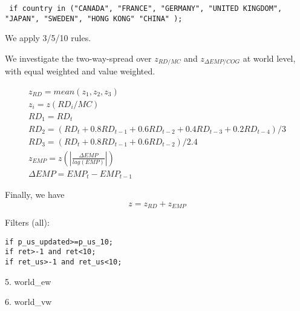

\usepackage[T1]{fontenc}




\thispagestyle{fancy}

\newcommand{\code}{\texttt}
\newcommand*{\Commonpath}{20190128/lagEMP/xUS-one-way-decile-big}



\code{
	if country in ("CANADA",
"FRANCE",
"GERMANY",
"UNITED KINGDOM",
"JAPAN",
"SWEDEN",
"HONG KONG"
"CHINA"
);
}

We apply 3/5/10 rules.

We investigate the two-way-spread over $z_{RD/MC}$ and $z_{\Delta EMP/COG}$ at world level, with equal weighted and value weighted. 


$$
\begin{aligned}
& z_{RD} = mean(z_1, z_2, z_3) \\
& z_i = z(RD_i/MC) \\
& RD_1 = RD_t \\
& RD_2 = (RD_t + 0.8RD_{t-1} + 0.6RD_{t-2} + 0.4RD_{t-3} + 0.2RD_{t-4})/3 \\
& RD_3 = (RD_t + 0.8RD_{t-1} + 0.6RD_{t-2})/2.4 
& \\
& z_{EMP} = z(|\frac{\Delta EMP}{lag(EMP)}|) \\
& \Delta EMP = EMP_t - EMP_{t-1}
\end{aligned}
$$

Finally, we have
$$
z = z_{RD} + z_{EMP}
$$


Filters (all):

\code{if p\_us\_updated>=p\_us\_10;} \\
\code{if ret>-1 and ret<10;} \\
\code{if ret\_us>-1 and ret\_us<10;} \\


\small

% 

% 

% 

% 

5. world\_ew


6. world\_vw



